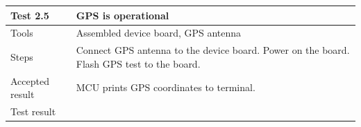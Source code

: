 \documentclass[]{dithesis}
\begin{document}
\bigskip

\begin{tabular}{| m{3cm} | m{12cm} | }
\hline
\textbf{Test 2.5} & \textbf{GPS is operational}  \\
\hline
Tools & Assembled device board, GPS antenna \\
\hline
Steps & Connect GPS antenna to the device board. Power on the board. Flash GPS test to the board.\\
\hline
Accepted result & MCU prints GPS coordinates to terminal. \\
\hline
Test result & \\
\hline
\end{tabular}

\end{document}
